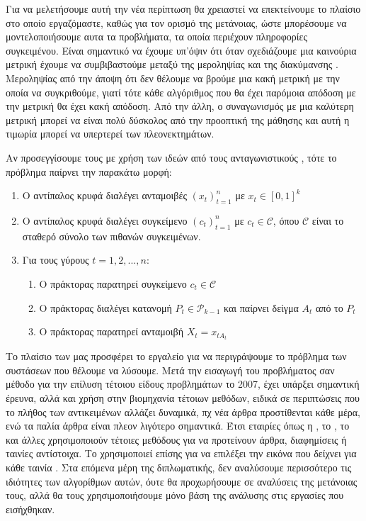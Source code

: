 Για να μελετήσουμε αυτή την νέα περίπτωση θα χρειαστεί να επεκτείνουμε το πλαίσιο στο οποίο εργαζόμαστε, καθώς για τον ορισμό της μετάνοιας, ώστε μπορέσουμε να μοντελοποιήσουμε αυτα τα προβλήματα, τα οποία περιέχουν πληροφορίες συγκειμένου. Είναι σημαντικό να έχουμε υπ'όψιν ότι όταν σχεδιάζουμε μια καινούρια μετρική έχουμε να  συμβιβαστούμε μεταξύ της μεροληψίας και της διακύμανσης . Μεροληψίας από την άποψη ότι δεν θέλουμε να βρούμε μια κακή μετρική με την οποία να συγκριθούμε, γιατί τότε κάθε αλγόριθμος που θα έχει παρόμοια απόδοση με την μετρική θα έχει κακή απόδοση. Από την άλλη, ο συναγωνισμός με μια καλύτερη μετρική μπορεί να είναι πολύ δύσκολος από την προοπτική της μάθησης και αυτή η τιμωρία μπορεί να υπερτερεί των πλεονεκτημάτων.  

Αν προσεγγίσουμε τους  με χρήση των ιδεών από τους ανταγωνιστικούς , τότε το πρόβλημα παίρνει την παρακάτω μορφή:

\begin{enumerate}
    \item Ο αντίπαλος κρυφά διαλέγει ανταμοιβές $(x_t)_{t=1}^n$ με $x_t \in [0,1]^k$
    \item Ο αντίπαλος κρυφά διαλέγει συγκείμενο $(c_t)_{t=1}^n$ με $c_t \in \mathcal{C}$, όπου $\mathcal{C}$ είναι το σταθερό σύνολο των πιθανών συγκειμένων. 
    \item Για τους γύρους $t=1,2,...,n$:
    \begin{enumerate}
        \item Ο πράκτορας παρατηρεί συγκείμενο  $c_t \in \mathcal{C}$
        \item Ο πράκτορας διαλέγει κατανομή $P_t \in \mathcal{P}_{k-1}$ και παίρνει δείγμα $A_t$  από το $P_t$
        \item Ο πράκτορας παρατηρεί ανταμοιβή $X_t = x_{tA_t}$
    \end{enumerate}
\end{enumerate}

Το πλαίσιο των  μας προσφέρει το εργαλείο για να περιγράψουμε το πρόβλημα των συστάσεων που θέλουμε να λύσουμε. Μετά την εισαγωγή του προβλήματος σαν μέθοδο για την επίλυση τέτοιου είδους προβλημάτων το 2007, έχει υπάρξει σημαντική έρευνα, αλλά και χρήση στην βιομηχανία τέτοιων μεθόδων, ειδικά σε περιπτώσεις που το πλήθος των αντικειμένων αλλάζει δυναμικά, πχ νέα άρθρα προστίθενται κάθε μέρα, ενώ τα παλία άρθρα είναι πλεον λιγότερο σημαντικά. Έτσι εταιρίες όπως η , το , το  και άλλες χρησιμοποιούν τέτοιες μεθόδους για να προτείνουν άρθρα, διαφημίσεις ή ταινίες αντίστοιχα. Το  χρησιμοποιεί επίσης  για να επιλέξει την εικόνα που δείχνει για κάθε ταινία \cite{blog_artwork_2017}.  Στα επόμενα μέρη της διπλωματικής, δεν αναλύσουμε περισσότερο τις ιδιότητες των αλγορίθμων αυτών, όυτε θα προχωρήσουμε σε αναλύσεις της μετάνοιας τους, αλλά θα τους χρησιμοποιήσουμε μόνο βάση της ανάλυσης στις εργασίες που εισήχθηκαν.